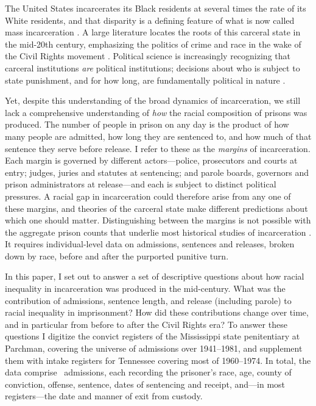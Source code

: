 \documentclass[12pt]{article}
\begin{document}
\newpage
\doublespacing

\noindent The United States incarcerates its Black residents at several times the rate of its White residents, and that disparity is a defining feature of what is now called mass incarceration \citep{Western:2007ut,Alexander:2012tj}.  A large literature locates the roots of this carceral state in the mid-20th century, emphasizing the politics of crime and race in the wake of the Civil Rights movement \citep{Beckett:1997vq,Weaver:2007vr,Murakawa:2014vj,Hinton:2016tb,Beckett:2020vz}.  Political science is increasingly recognizing that carceral institutions \emph{are} political institutions; decisions about who is subject to state punishment, and for how long, are fundamentally political in nature \citep{Gottschalk:2006ub,Lerman:2014wr,Soss:2017wx}.

Yet, despite this understanding of the broad dynamics of incarceration, we still lack a comprehensive understanding of \emph{how} the racial composition of prisons was produced.  The number of people in prison on any day is the product of how many people are admitted, how long they are sentenced to, and how much of that sentence they serve before release.  I refer to these as the \emph{margins} of incarceration.  Each margin is governed by different actors---police, prosecutors and courts at entry; judges, juries and statutes at sentencing; and parole boards, governors and prison administrators at release---and each is subject to distinct political pressures.  A racial gap in incarceration could therefore arise from any one of these margins, and theories of the carceral state make different predictions about which one should matter.  Distinguishing between the margins is not possible with the aggregate prison counts that underlie most historical studies of incarceration \citep{Langan:1991ud,Muller:2012wf}.  It requires individual-level data on admissions, sentences and releases, broken down by race, before and after the purported punitive turn.

In this paper, I set out to answer a set of descriptive questions about how racial inequality in incarceration was produced in the mid-century.  What was the contribution of admissions, sentence length, and release (including parole) to racial inequality in imprisonment?  How did these contributions change over time, and in particular from before to after the Civil Rights era?  To answer these questions I digitize the convict registers of the Mississippi state penitentiary at Parchman, covering the universe of admissions over 1941--1981, and supplement them with intake registers for Tennessee covering most of 1960--1974.  In total, the data comprise \unskip~admissions, each recording the prisoner's race, age, county of conviction, offense, sentence, dates of sentencing and receipt, and---in most registers---the date and manner of exit from custody.
\end{document}
